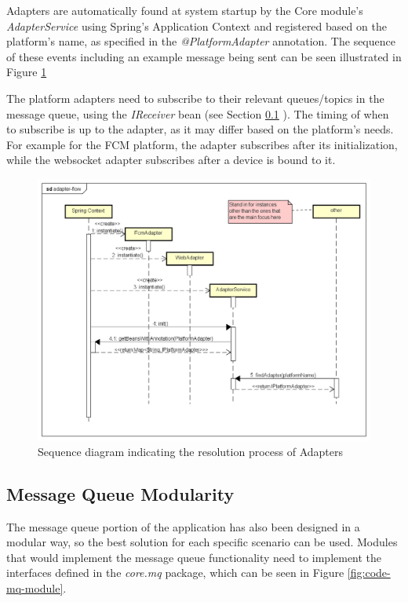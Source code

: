 Adapters are automatically found at system startup by the Core module's \textit{AdapterService} using Spring's Application Context and registered based on the platform's name, as specified in the \textit{@PlatformAdapter} annotation. The sequence of these events including an example message being sent can be seen illustrated in Figure \ref{fig:adapter-flow}

The platform adapters need to subscribe to their relevant queues/topics in the message queue, using the \textit{IReceiver} bean (see Section \ref{design:mq-modularity} ). The timing of when to subscribe is up to the adapter, as it may differ based on the platform's needs. For example for the FCM platform, the adapter subscribes after its initialization, while the websocket adapter subscribes after a device is bound to it.

\begin{figure}[!ht]
	\centering
	\includegraphics[width=1\textwidth]{figures/03_design/adapter-flow}
    \caption{Sequence diagram indicating the resolution process of Adapters}
    \label{fig:adapter-flow}
\end{figure}

\clearpage

\subsection{Message Queue Modularity} \label{design:mq-modularity}
The message queue portion of the application has also been designed in a modular way, so the best solution for each specific scenario can be used. Modules that would implement the message queue functionality need to implement the interfaces defined in the \textit{core.mq} package, which can be seen in Figure \ref{fig:code-mq-module}.


